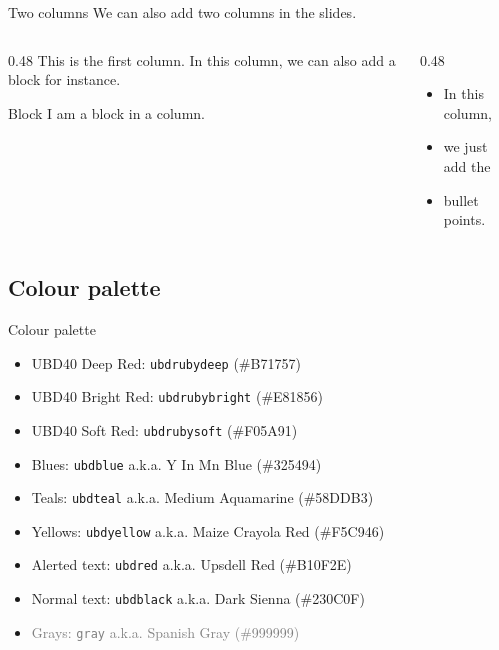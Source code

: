 \documentclass[,aspectratio=43]{beamer}
\providecommand{\tightlist}{%
  \setlength{\itemsep}{0pt}\setlength{\parskip}{0pt}}
\begin{document}
\begin{frame}{Two columns}
\label{two-columns}
We can also add two columns in the slides.\bigskip

\begin{columns}[T]
\begin{column}{0.48\textwidth}
This is the first column. In this column, we can also add a block for
instance.

\begin{block}{Block}
\label{block}
I am a block in a column.
\end{block}
\end{column}

\begin{column}{0.48\textwidth}
\begin{itemize}
\tightlist
\item
  In this column,
\item
  we just add the
\item
  bullet points.
\end{itemize}
\end{column}
\end{columns}
\end{frame}

\subsection{Colour palette}\label{colour-palette}

\begin{frame}[fragile]{Colour palette}
\begin{itemize}
\tightlist
\item
  \textcolor{ubdrubydeep}{UBD40 Deep Red: \texttt{ubdrubydeep}
  (\#B71757)}
\item
  \textcolor{ubdrubybright}{UBD40 Bright Red: \texttt{ubdrubybright}
  (\#E81856)}
\item
  \textcolor{ubdrubysoft}{UBD40 Soft Red: \texttt{ubdrubysoft}
  (\#F05A91)}
\item
  \textcolor{ubdblue}{Blues: \texttt{ubdblue} a.k.a. Y In Mn Blue
  (\#325494)}
\item
  \textcolor{ubdteal}{Teals: \texttt{ubdteal} a.k.a. Medium Aquamarine
  (\#58DDB3)}
\item
  \textcolor{ubdyellow}{Yellows: \texttt{ubdyellow} a.k.a. Maize Crayola
  Red (\#F5C946)}
\item
  \textcolor{ubdred}{Alerted text: \texttt{ubdred} a.k.a. Upsdell Red
  (\#B10F2E)}
\item
  \textcolor{ubdblack}{Normal text: \texttt{ubdblack} a.k.a. Dark Sienna
  (\#230C0F)}
\item
  \textcolor{gray}{Grays: \texttt{gray} a.k.a. Spanish Gray (\#999999)}
\end{itemize}

\end{frame}
\end{document}
